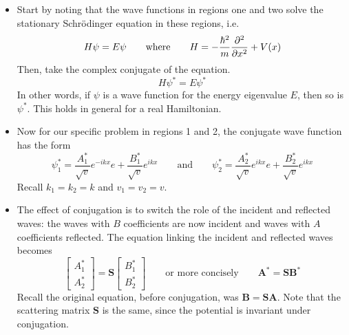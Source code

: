 \documentclass[11pt, a4paper]{article}
\newcommand{\eqtext}[1]{\qquad \text{#1} \qquad}
\newcommand{\schro}{Schr\"{o}dinger\xspace}
\renewcommand{\vec}[1]{\bm{#1}} %
\newcommand{\mat}[1]{\mathbf{#1}} %
\begin{document}
\begin{itemize}
	\item  Start by noting that the wave functions in regions one and two solve the stationary \schro equation in these regions, i.e.
	\begin{equation*}
		H \psi = E \psi \eqtext{where} H = -\frac{\hbar^{2}}{m}\pdv[2]{}{x} + V(x)
	\end{equation*}
	Then, take the complex conjugate of the equation.
	\begin{equation*}
		H \psi^{*} = E\psi^{*}
	\end{equation*}
	In other words, if $ \psi $ is a wave function for the energy eigenvalue $ E $, then so is $ \psi^{*} $. This holds in general for a real Hamiltonian. 
	
	\item Now for our specific problem in regions 1 and 2, the conjugate wave function has the form
	\begin{equation*}
		\psi_{1}^{*} = \frac{A_{1}^{*}}{\sqrt{v}}e^{-ikx} e + \frac{B_{1}^{*}}{\sqrt{v}}e^{ikx} \eqtext{and} \psi_{2}^{*} = \frac{A_{2}^{*}}{\sqrt{v}}e^{ikx} e + \frac{B_{2}^{*}}{\sqrt{v}}e^{ikx}
	\end{equation*}
	Recall $ k_{1} = k_{2} = k $ and $ v_{1} = v_{2} = v $.
	
	\item The effect of conjugation is to switch the role of the incident and reflected waves: the waves with $ B $ coefficients are now incident and waves with $ A $ coefficients reflected. The equation linking the incident and reflected waves becomes
	\begin{equation*}
		\begin{bmatrix}
			A_{1}^{*}\\
			A_{2}^{*} 
		\end{bmatrix}
		= 
		\mat{S}
		\begin{bmatrix}
			B_{1}^{*}\\
			B_{2}^{*}
		\end{bmatrix}
		\eqtext{or more concisely} \vec{A}^{*} = \mat{S} \vec{B}^{*}
	\end{equation*}
	Recall the original equation, before conjugation, was $ \vec{B} = \mat{S} \vec{A} $. Note that the scattering matrix $ \mat{S} $ is the same, since the potential is invariant under conjugation.
	

\end{itemize}
\end{document}
